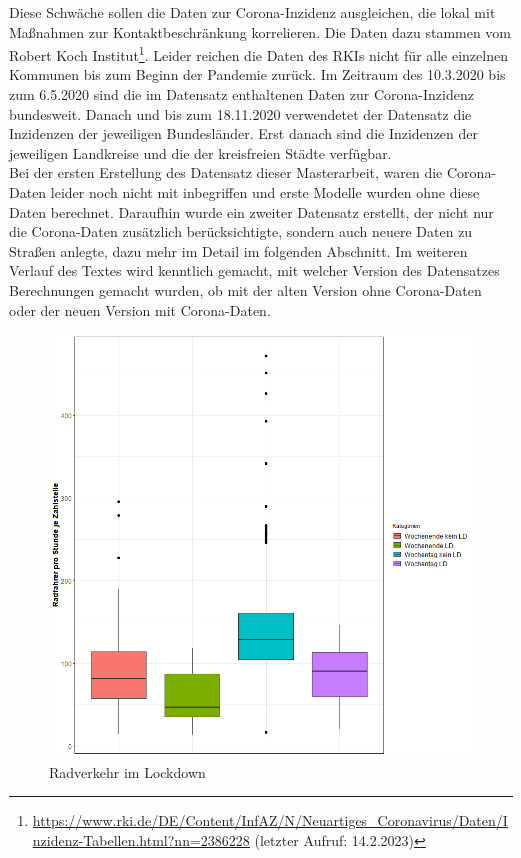 \documentclass[a4paper,12pt]{thesis}
\begin{document}
Diese Schwäche sollen die Daten zur Corona-Inzidenz ausgleichen, die lokal mit Maßnahmen zur Kontaktbeschränkung korrelieren. Die Daten dazu stammen vom Robert Koch Institut\footnote{\url{https://www.rki.de/DE/Content/InfAZ/N/Neuartiges_Coronavirus/Daten/Inzidenz-Tabellen.html?nn=2386228} (letzter Aufruf: 14.2.2023)}. Leider reichen die Daten des RKIs nicht für alle einzelnen Kommunen bis zum Beginn der Pandemie zurück. Im Zeitraum des 10.3.2020 bis zum 6.5.2020 sind die im Datensatz enthaltenen Daten zur Corona-Inzidenz bundesweit. Danach und bis zum 18.11.2020 verwendetet der Datensatz die Inzidenzen der jeweiligen Bundesländer. Erst danach sind die Inzidenzen der jeweiligen Landkreise und die der kreisfreien Städte verfügbar.\\
Bei der ersten Erstellung des Datensatz dieser Masterarbeit, waren die Corona-Daten leider noch nicht mit inbegriffen und erste Modelle wurden ohne diese Daten berechnet. Daraufhin wurde ein zweiter Datensatz erstellt, der nicht nur die Corona-Daten zusätzlich berücksichtigte, sondern auch neuere Daten zu Straßen anlegte, dazu mehr im Detail im folgenden Abschnitt. Im weiteren Verlauf des Textes wird kenntlich gemacht, mit welcher Version des Datensatzes Berechnungen gemacht wurden, ob mit der alten Version ohne Corona-Daten oder der neuen Version mit Corona-Daten.\\

\begin{figure}[!ht]
	\centering
	\includegraphics[width=\textwidth]{Plots/plot63.png}
	\caption{Radverkehr im Lockdown}
	\label{CoronaandBiking}
\end{figure}
\end{document}
